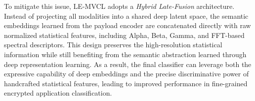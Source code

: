 To mitigate this issue, LE-MVCL adopts a \textit{Hybrid Late-Fusion} architecture. Instead of projecting all modalities into a shared deep latent space, the semantic embeddings learned from the payload encoder are concatenated directly with raw normalized statistical features, including Alpha, Beta, Gamma, and FFT-based spectral descriptors. This design preserves the high-resolution statistical information while still benefiting from the semantic abstraction learned through deep representation learning. As a result, the final classifier can leverage both the expressive capability of deep embeddings and the precise discriminative power of handcrafted statistical features, leading to improved performance in fine-grained encrypted application classification.









